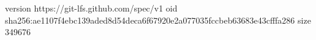 version https://git-lfs.github.com/spec/v1
oid sha256:ae1107f4ebc139aded8d54deca6f67920e2a077035fccbeb63683e43cfffa286
size 349676
